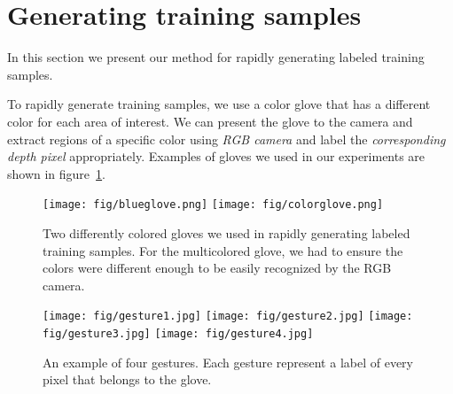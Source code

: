 \section{Generating training samples}
\label{sec: generating_training}
\cutsection

In this section we present our method for rapidly generating labeled training samples.

To rapidly generate training samples, we use a color glove that has a different color for each area of interest. We can present the glove to the camera and extract regions of a specific color using \textit{RGB camera} and label the \textit{corresponding depth pixel} appropriately. Examples of gloves we used in our experiments are shown in figure~\ref{fig:gloves}.

\begin{figure}
\begin{center}
\texttt{[image: fig/blueglove.png]}
\texttt{[image: fig/colorglove.png]}
\end{center}
	\cutcaption
\caption{Two differently colored gloves we used in rapidly generating labeled training samples. For the multicolored glove, we had to ensure the colors were different enough to be easily recognized by the RGB camera.}
\label{fig:gloves}
\end{figure}

\begin{figure}
\begin{center}

\texttt{[image: fig/gesture1.jpg]}
\texttt{[image: fig/gesture2.jpg]}
\texttt{[image: fig/gesture3.jpg]}
\texttt{[image: fig/gesture4.jpg]}

\end{center}
	\cutcaption
\caption{An example of four gestures. Each gesture represent a label of every pixel that belongs to the glove.  
}
\label{fig:gestures}
\end{figure}


